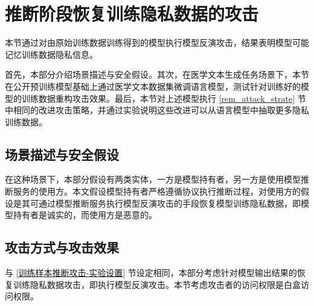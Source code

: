 \section{推断阶段恢复训练隐私数据的攻击}\label{chap3_CMDD_FT_Exp}

本节通过对由原始训练数据训练得到的模型执行模型反演攻击，结果表明模型可能记忆训练数据隐私信息。


首先，本部分介绍场景描述与安全假设。其次，在医学文本生成任务场景下，本节在公开预训练模型基础上通过医学文本数据集微调语言模型，测试针对训练好的模型的训练数据重构攻击效果。最后，本节对上述模型执行 \ref{rem_attack_strate} 节中相同的改进攻击策略，并通过实验说明这些改进可以从语言模型中抽取更多隐私训练数据。

\subsection{场景描述与安全假设}


在这种场景下，本部分假设有两类实体，一方是模型持有者，另一方是使用模型推断服务的使用方。本文假设模型持有者严格遵循协议执行推断过程，对使用方的假设是其可通过模型推断服务执行模型反演攻击的手段恢复模型训练隐私数据，即模型持有者是诚实的，而使用方是恶意的。

\subsection{攻击方式与攻击效果} \label{chap3_attack_desc}


与 \ref{训练样本推断攻击-实验设置} 节设定相同，本部分考虑针对模型输出结果的恢复训练隐私数据攻击，即执行模型反演攻击。本节考虑攻击者的访问权限是白盒访问权限。

